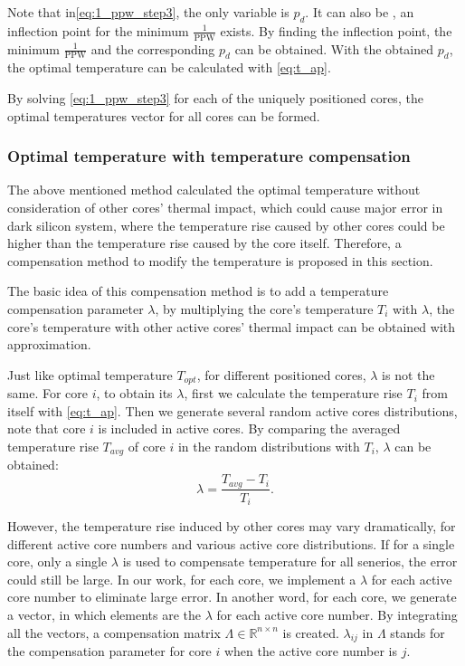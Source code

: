 Note that in\eqref{eq:1_ppw_step3}, the only variable is $p_{d}$. It can also be , an inflection point for the minimum $\frac{1}{\text{PPW}}$ exists. By finding the inflection point, the minimum $\frac{1}{\text{PPW}}$ and the corresponding $p_{d}$ can be obtained. With the obtained $p_{d}$, the optimal temperature can be calculated with \eqref{eq:t_ap}.

By solving \eqref{eq:1_ppw_step3} for each of the uniquely positioned cores, the optimal temperatures vector for all cores can be formed.


\subsubsection{Optimal temperature with temperature compensation}
The above mentioned method calculated the optimal temperature without consideration of other cores' thermal impact, which could cause major error in dark silicon system, where the temperature rise caused by other cores could be higher than the temperature rise caused by the core itself. Therefore, a compensation method to modify the temperature is proposed in this section.

The basic idea of this compensation method is to add a temperature compensation parameter $\lambda$, by multiplying the core's temperature $T_{i}$ with $\lambda$, the core's temperature with other active cores' thermal impact can be obtained with approximation.

Just like optimal temperature $T_{opt}$, for different positioned cores, $\lambda$ is not the same. For core $i$, to obtain its $\lambda$, first we calculate the temperature rise $T_{i}$ from itself with \eqref{eq:t_ap}. Then we generate several random active cores distributions, note that core $i$ is included in active cores. By comparing the averaged temperature rise $T_{avg}$ of core $i$ in the random distributions with $T_{i}$, $\lambda$ can be obtained:
\begin{equation}\label{eq:lambda}
\lambda = \frac{T_{avg}-T_{i}}{T_{i}}.
\end{equation}

However, the temperature rise induced by other cores may vary dramatically, for different active core numbers and various active core distributions. If for a single core, only a single $\lambda$ is used to compensate temperature for all senerios, the error could still be large. In our work, for each core, we implement a $\lambda$ for each active core number to eliminate large error. In another word, for each core, we generate a vector, in which elements are the $\lambda$ for each active core number. By integrating all the vectors, a compensation matrix $\Lambda \in \mathbb{R}^{n \times n}$ is created. $\lambda_{ij}$ in $\Lambda$ stands for the compensation parameter for core $i$ when the active core number is $j$.


